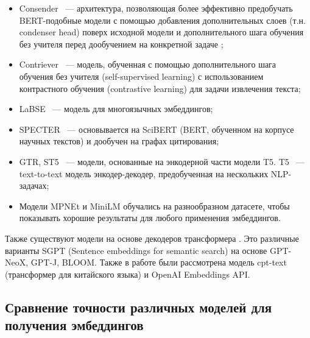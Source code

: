 \begin{itemize}
    \item Consender ~--- архитектура, позволяющая более эффективно предобучать BERT-подобные модели с помощью добавления дополнительных слоев (т.н. condenser head) поверх исходной модели и дополнительного шага обучения без учителя перед дообучением на конкретной задаче \cite{condenser};
    \item Contriever ~--- модель, обученная с помощью дополнительного шага обучения без учителя (self-supervised learning) с использованием контрастного обучения (contrastive learning) для задачи извлечения текста;
    \item LaBSE ~--- модель для многоязычных эмбеддингов;
    \item SPECTER ~--- основывается на SciBERT (BERT, обученном на корпусе научных текстов) и дообучен на графах цитирования;
    \item GTR, ST5 ~--- модели, основанные на энкодерной части модели T5. T5 ~--- text-to-text модель энкодер-декодер, предобученная на нескольких NLP-задачах;
    \item Модели MPNEt и MiniLM обучались на разнообразном датасете, чтобы показывать хорошие результаты для любого применения эмбеддингов.
\end{itemize}

Также существуют модели на основе декодеров трансформера \cite{mteb}. Это различные варианты SGPT (Sentence embeddings for semantic search) на основе GPT-NeoX, GPT-J, BLOOM. Также в работе были рассмотрена модель cpt-text (трансформер для китайского языка) и OpenAI Embeddings API.

\subsection{Сравнение точности различных моделей для получения эмбеддингов}
\label{chap:compare-models}

